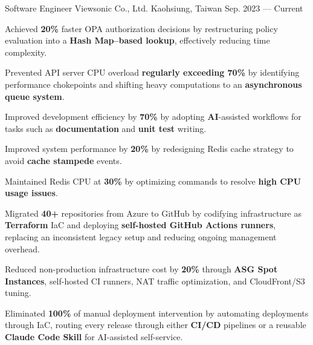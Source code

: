 

\begin{cventries}

  \cventry
    {Software Engineer } %
    {Viewsonic Co., Ltd.} %
    {Kaohsiung, Taiwan} %
    {Sep. 2023 --- Current} %
    {
      \begin{cvitems} %
        \item {Achieved \textbf{20\%} faster OPA authorization decisions by restructuring policy evaluation into a \textbf{Hash Map–based lookup}, effectively reducing time complexity.}
        \item {Prevented API server CPU overload \textbf{regularly exceeding 70\%} by identifying performance chokepoints and shifting heavy computations to an \textbf{asynchronous queue system}.}
        \item {Improved development efficiency by \textbf{70\%} by adopting \textbf{AI}-assisted workflows for tasks such as \textbf{documentation} and \textbf{unit test} writing.}
        \item {Improved system performance by \textbf{20\%} by redesigning Redis cache strategy to avoid \textbf{cache stampede} events.}
        \item {Maintained Redis CPU at \textbf{30\%} by optimizing commands to resolve \textbf{high CPU usage issues}.}
        \item {Migrated \textbf{40+} repositories from Azure to GitHub by codifying infrastructure as \textbf{Terraform} IaC and deploying \textbf{self-hosted GitHub Actions runners}, replacing an inconsistent legacy setup and reducing ongoing management overhead.}
        \item {Reduced non-production infrastructure cost by \textbf{20\%} through \textbf{ASG Spot Instances}, self-hosted CI runners, NAT traffic optimization, and CloudFront/S3 tuning.}
        \item {Eliminated \textbf{100\%} of manual deployment intervention by automating deployments through IaC, routing every release through either \textbf{CI/CD} pipelines or a reusable \textbf{Claude Code Skill} for AI-assisted self-service.}
      \end{cvitems}
    }


\end{cventries}
